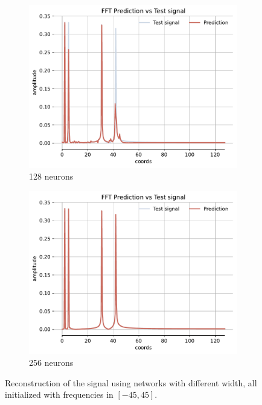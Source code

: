 \begin{figure}[h!]
\begin{subfigure}[b]{0.32\textwidth}
        \centering
        \includegraphics[width=\textwidth]{img/ch4/fft_w45all_hf128.pdf}
        \caption{128 neurons}
        \label{fig:fft-128-full-45}
    \end{subfigure}
    \begin{subfigure}[b]{0.32\textwidth}
        \centering
        \includegraphics[width=\textwidth]{img/ch4/fft_w45all_hf256.pdf}
        \caption{256 neurons}
        \label{fig:fft-256-full-45}
    \end{subfigure}
    \label{fig:all-freqs-reconstruction}
    \caption{Reconstruction of the signal using networks with different width, all initialized with frequencies in $[-45, 45]$.}
\end{figure}


